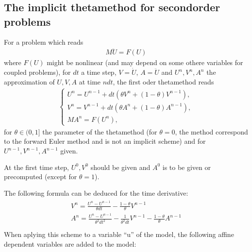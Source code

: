 \documentclass[a4paper,11pt,english]{sphinxmanual}
\begin{document}
\subsection{The implicit theta\sphinxhyphen{}method for second\sphinxhyphen{}order problems}
\label{\detokenize{userdoc/model_time_integration:the-implicit-theta-method-for-second-order-problems}}
For a problem which reads
\begin{equation*}
\begin{split}M\ddot{U} = F(U)\end{split}
\end{equation*}
where \(F(U)\) might be nonlinear (and may depend on some othere variables for coupled problems), for \(dt\) a time step, \(V = \dot{U}\), \(A = \ddot{U}\) and \(U^n, V^n, A^n\) the approximation of \(U, V, A\) at time \(ndt\), the first oder theta\sphinxhyphen{}method reads
\begin{equation*}
\begin{split}\left\{ \begin{array}{l}
U^n = U^{n-1} + dt(\theta V^n + (1-\theta) V^{n-1}), \\
V^n = V^{n-1} + dt(\theta A^n + (1-\theta) A^{n-1}), \\
MA^n = F(U^n),
\end{array}\right.\end{split}
\end{equation*}
for \(\theta \in (0, 1]\) the parameter of the theta\sphinxhyphen{}method (for \(\theta = 0\), the method correspond to the forward Euler method and is not an implicit scheme) and for \(U^{n-1}, V^{n-1}, A^{n-1}\) given.

At the first time step, \(U^0, V^0\) should be given and \(A^0\) is to be given or pre\sphinxhyphen{}computed (except for \(\theta = 1\)).

The following formula can be deduced for the time derivative:
\begin{align*}\!\begin{aligned}
V^n = \frac{U^n - U^{n-1}}{\theta dt} - \frac{1-\theta}{\theta}V^{n-1}\\
A^n = \frac{U^n - U^{n-1}}{\theta^2 dt^2} - \frac{1}{\theta^2dt}V^{n-1} - \frac{1-\theta}{\theta}A^{n-1}\\
\end{aligned}\end{align*}
When aplying this scheme to a variable “u” of the model, the following affine dependent variables are added to the model:

\begin{sphinxVerbatim}[commandchars=\\\{\}]
 
\end{sphinxVerbatim}
\end{document}
